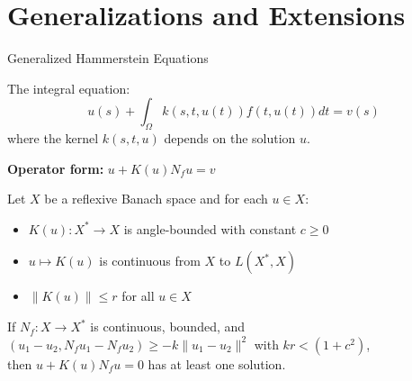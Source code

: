\documentclass[aspectratio=169,10pt]{beamer}
\begin{document}
\section{Generalizations and Extensions}

\begin{frame}{Generalized Hammerstein Equations}
    \begin{definition}
        The integral equation:
        \[
            u(s) + \int_{\Omega} k(s, t, u(t)) f(t, u(t)) dt = v(s)
        \]
        where the kernel $k(s,t,u)$ depends on the solution $u$.
    \end{definition}

    \vspace{0.3cm}

    \textbf{Operator form:} $u + K(u) N_f u = v$

    \vspace{0.3cm}

    \begin{theorem}
        Let $X$ be a reflexive Banach space and for each $u \in X$:
        \begin{itemize}
            \item $K(u): X^* \to X$ is angle-bounded with constant $c \geq 0$
            \item $u \mapsto K(u)$ is continuous from $X$ to $L(X^*, X)$
            \item $\|K(u)\| \leq r$ for all $u \in X$
        \end{itemize}
        If $N_f: X \to X^*$ is continuous, bounded, and $(u_1 - u_2, N_f u_1 - N_f u_2) \geq -k\|u_1 - u_2\|^2$ with $kr < (1+c^2)$,\\
        then $u + K(u)N_f u = 0$ has at least one solution.
    \end{theorem}
\end{frame}
\end{document}
